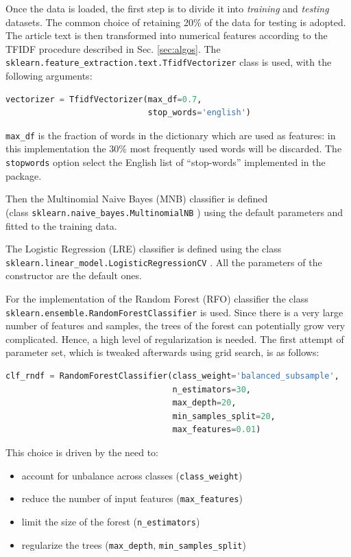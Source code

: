 \documentclass[a4paper,12pt]{article} %
\begin{document}
Once the data is loaded, the first step is to divide it into \textit{training} and \textit{testing} datasets.
The common choice of retaining 20\% of the data for testing is adopted. \\
The article text is then transformed into numerical features according to the TFIDF procedure
described in Sec. \ref{sec:algos}. The \texttt{sklearn.feature\_extraction.text.TfidfVectorizer} \cite{scikit-tfidf}
class is used, with the following arguments:

\begin{lstlisting}[language=Python]
vectorizer = TfidfVectorizer(max_df=0.7,
                             stop_words='english')
\end{lstlisting}

\texttt{max\_df} is the fraction of words in the dictionary which are used as features:
in this implementation the 30\% most frequently used words will be discarded.
The \texttt{stopwords} option select the English list of ``stop-words'' implemented in the package.

Then the Multinomial Naive Bayes (MNB) classifier is defined \\
(class \texttt{sklearn.naive\_bayes.MultinomialNB} \cite{scikit-mnb})
using the default parameters and fitted to the training data.

The Logistic Regression (LRE) classifier is defined using the class \\
\texttt{sklearn.linear\_model.LogisticRegressionCV} \cite{scikit-lr}.
All the parameters of the constructor are the default ones.

For the implementation of the Random Forest (RFO) classifier the class\\
\texttt{sklearn.ensemble.RandomForestClassifier} \cite{scikit-rndf} is used.
Since there is a very large number of features and samples, the trees of the forest can
potentially grow very complicated. Hence, a high level of regularization is needed.
The first attempt of parameter set, which is tweaked afterwards using grid search, is as follows:
\begin{lstlisting}[language=Python]
clf_rndf = RandomForestClassifier(class_weight='balanced_subsample',
                                  n_estimators=30,
                                  max_depth=20,
                                  min_samples_split=20,
                                  max_features=0.01)
\end{lstlisting}
This choice is driven by the need to:
\begin{itemize}
    \item account for unbalance across classes (\texttt{class\_weight})
    \item reduce the number of input features (\texttt{max\_features})
    \item limit the size of the forest (\texttt{n\_estimators})
    \item regularize the trees (\texttt{max\_depth}, \texttt{min\_samples\_split})
\end{itemize}
\end{document}

